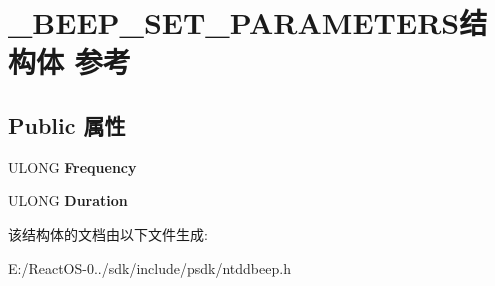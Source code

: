 \hypertarget{struct___b_e_e_p___s_e_t___p_a_r_a_m_e_t_e_r_s}{}\section{\+\_\+\+B\+E\+E\+P\+\_\+\+S\+E\+T\+\_\+\+P\+A\+R\+A\+M\+E\+T\+E\+R\+S结构体 参考}
\label{struct___b_e_e_p___s_e_t___p_a_r_a_m_e_t_e_r_s}
\subsection*{Public 属性}
\begin{DoxyCompactItemize}
\item 
\mbox{\label{struct___b_e_e_p___s_e_t___p_a_r_a_m_e_t_e_r_s_a760aff91d6ac94b0daeade53e78806e4}} 
U\+L\+O\+NG {\bfseries Frequency}
\item 
\mbox{\label{struct___b_e_e_p___s_e_t___p_a_r_a_m_e_t_e_r_s_a2952f09ca74b44e6795107efeb21783b}} 
U\+L\+O\+NG {\bfseries Duration}
\end{DoxyCompactItemize}


该结构体的文档由以下文件生成\+:\begin{DoxyCompactItemize}
\item 
E\+:/\+React\+O\+S-\/0../sdk/include/psdk/ntddbeep.\+h\end{DoxyCompactItemize}
